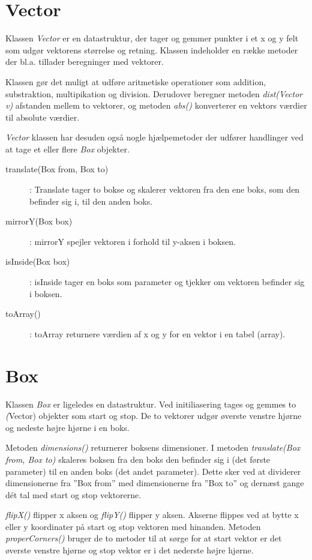 \section{Vector}

Klassen \emph{Vector} er en datastruktur, der tager og gemmer punkter i et x og y felt som udgør vektorens størrelse og retning. Klassen indeholder en række metoder der bl.a. tillader beregninger med vektorer.

Klassen gør det muligt at udføre aritmetiske operationer som addition, substraktion, multipikation og division. Derudover beregner metoden \emph{dist(Vector v)} afstanden mellem to vektorer, og metoden \emph{abs()} konverterer en vektors værdier til absolute værdier.

\emph{Vector} klassen har desuden også nogle hjælpemetoder der udfører handlinger ved at tage et eller flere \emph{Box} objekter.

\begin{description}
	\item[translate(Box from, Box to)]: Translate tager to bokse og skalerer vektoren fra den ene boks, som den befinder sig i, til den anden boks.
	\item[mirrorY(Box box)]: mirrorY spejler vektoren i forhold til y-aksen i boksen.
	\item[isInside(Box box)]: isInside tager en boks som parameter og tjekker om vektoren befinder sig i boksen.
	\item[toArray()]: toArray returnere værdien af x og y for en vektor i en tabel (array).
\end{description}

\section{Box}

Klassen \emph{Box} er ligeledes en datastruktur. Ved initiliasering tages og gemmes to \emph(Vector) objekter som start og stop. De to vektorer udgør øverste venstre hjørne og nedeste højre hjørne i en boks.

Metoden \emph{dimensions()} returnerer boksens dimensioner. I metoden \emph{translate(Box from, Box to)} skaleres boksen fra den boks den befinder sig i (det første parameter) til en anden boks (det andet parameter). Dette sker ved at dividerer dimensionerne fra ''Box from'' med dimensionerne fra ''Box to'' og dernæst gange dét tal med start og stop vektorerne.

\emph{flipX()} flipper x aksen og \emph{flipY()} flipper y aksen. Akserne flippes ved at bytte x eller y koordinater på start og stop vektoren med hinanden. Metoden \emph{properCorners()} bruger de to metoder til at sørge for at start vektor er det øverste venstre hjørne og stop vektor er i det nederste højre hjørne.

